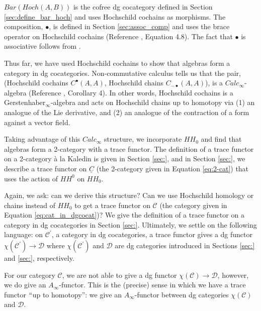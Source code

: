 $Bar(Hoch(A,B))$ is the cofree dg cocategory defined in Section \ref{sec:define_bar_hoch} and uses Hochschild cochains as morphisms. The composition, $\bullet$, is defined in Section \ref{sec:assoc_comp} and uses the brace operator on Hochschild cochains (Reference \cite{T}, Equation 4.8). The fact that $\bullet$ is associative follows from \cite{(Getzler-Jones; Voronov-Gerstenhaber, Lyubashenko-Manzyuk; Keller)}. 

Thus far, we have used Hochschild cochains to show that algebras form a category in dg cocategories. Non-commutative calculus tells us that the pair, (Hochschild cochains $C^\bullet(A,A)$, Hochschild chains $C_{-\bullet}(A,A)$), is a $Calc_\infty$-algebra (Reference \cite{DTT}, Corollary 4). In other words, Hochschild cochains is a Gerstenhaber$_\infty$-algebra and acts on Hochschild chains up to homotopy via (1) an analogue of the Lie derivative, and (2) an analogue of the contraction of a form against a vector field.

Taking advantage of this $Calc_\infty$ structure, we incorporate $HH_0$ and find that algebras form a 2-category with a trace functor. The definition of a trace functor on a 2-category \`{a} la Kaledin is given in Section \ref{sec:}, and in Section \ref{sec:}, we describe a trace functor on $\underline{C}$ (the 2-category given in Equation \ref{eq:2-cat}) that uses the action of $HH^0$ on $HH_0$.

Again, we ask: can we derive this structure? Can we use Hochschild homology or chains instead of $HH_0$ to get a trace functor on $\mathcal{C}$ (the category given in Equation \ref{eq:cat_in_dgcocat})? We give the definition of a trace functor on a category in dg cocategories in Section \ref{sec:}. Ultimately, we settle on the following language: on $\mathcal{C}^\prime$, a category in dg cocategories, a trace functor gives a dg functor $\chi(\mathcal{C}^\prime) \to \mathcal{D}$ where $\chi(\mathcal{C}^\prime)$ and $\mathcal{D}$ are dg categories introduced in Sections \ref{sec:} and \ref{sec:}, respectively. 

For our category $\mathcal{C}$, we are not able to give a dg functor $\chi(\mathcal{C}) \to \mathcal{D}$, however, we do give an $A_\infty$-functor. This is the (precise) sense in which we have a trace functor $``$up to homotopy'': we give an $A_\infty$-functor between dg categories $\chi(\mathcal{C})$ and $\mathcal{D}$.



